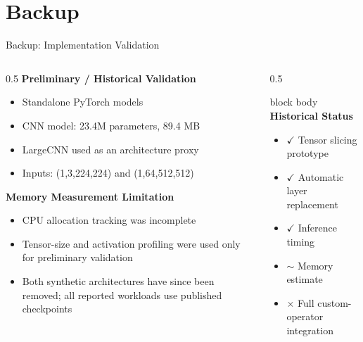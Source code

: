 \documentclass[10pt,aspectratio=169]{beamer}
\begin{document}
\appendix
\section{Backup}

\begin{frame}{Backup: Implementation Validation}
\begin{columns}
\begin{column}{0.5\textwidth}
\textbf{Preliminary / Historical Validation}
\begin{itemize}
\small
\item Standalone PyTorch models
\item CNN model: 23.4M parameters, 89.4 MB
\item LargeCNN used as an architecture proxy
\item Inputs: (1,3,224,224) and (1,64,512,512)
\end{itemize}

\vspace{0.25cm}
\textbf{Memory Measurement Limitation}
\begin{itemize}
\small
\item CPU allocation tracking was incomplete
\item Tensor-size and activation profiling were used only for preliminary validation
\item Both synthetic architectures have since been removed; all reported workloads use published checkpoints
\end{itemize}
\end{column}
\begin{column}{0.5\textwidth}
\begin{beamercolorbox}[sep=0.3em,center,rounded=true,shadow=true]{block body}
\small
\textbf{Historical Status}
\begin{itemize}
\small
\item \textcolor{edgegreen}{$\checkmark$} Tensor slicing prototype
\item \textcolor{edgegreen}{$\checkmark$} Automatic layer replacement
\item \textcolor{edgegreen}{$\checkmark$} Inference timing
\item \textcolor{edgeblue}{$\sim$} Memory estimate
\item \textcolor{edgered}{$\times$} Full custom-operator integration
\end{itemize}
\end{beamercolorbox}
\end{column}
\end{columns}
\end{frame}
\end{document}
